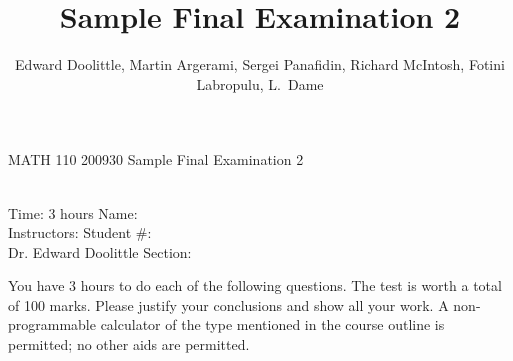 \documentclass[12pt]{article}
\title{Sample Final Examination 2}
\author{Edward Doolittle, Martin Argerami, Sergei Panafidin, Richard McIntosh, Fotini Labropulu, L.\ Dame}
\begin{document}
\thispagestyle{plain}

\begin{center}
  \LARGE{MATH 110 200930 Sample Final Examination 2}
\end{center}

\begin{flushleft}
\quad\\
Time:  3 hours                  \hfill       Name: \underline{\hspace{2in}}  \\
Instructors:                    \hfill Student \#: \underline{\hspace{2in}}  \\
\quad Dr. Edward Doolittle      \hfill    Section: \underline{\hspace{2in}}  \\
\end{flushleft}


\noindent
You have 3 hours to do each of the following questions.
The test is worth a total of 100 marks.
Please justify your conclusions and
show all your work.
A non-programmable calculator of the type mentioned in the course outline
is permitted; no other aids are permitted.
\end{document}
